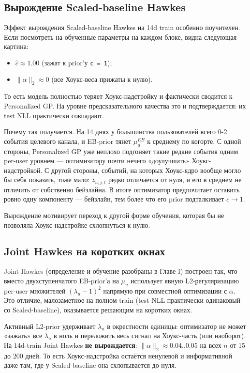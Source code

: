 \documentclass[12pt,a4paper]{article}
\begin{document}
\FloatBarrier
\subsection{Вырождение Scaled-baseline Hawkes}

Эффект вырождения Scaled-baseline Hawkes на 14d train особенно поучителен. Если посмотреть на обученные параметры на каждом блоке, видна следующая картина:

\begin{itemize}
  \item $\hat{c} \approx  1.00$ (зажат к prior'у \texttt{c = 1});
  \item $\|\alpha \|_2 \approx  0$ (все Хоукс-веса прижаты к нулю).
\end{itemize}


То есть модель полностью теряет Хоукс-надстройку и фактически сводится к Personalized GP. На уровне предсказательного качества это и подтверждается: их test NLL практически совпадают.

Почему так получается. На 14 днях у большинства пользователей всего 0-2 события целевого канала, и EB-prior тянет $\mu _u^{EB}$ к среднему по когорте. С одной стороны, Personalized GP уже неплохо подгоняет такие редкие события одним per-user уровнем --- оптимизатору почти нечего «доулучшать» Хоукс-надстройкой. С другой стороны, событий, на которых Хоукс-ядро вообще могло бы себя показать, тоже мало: $z_{u,j,t}$ редко отличается от нуля, и его в среднем не отличить от собственно бейзлайна. В итоге оптимизатор предпочитает оставить ровно одну компоненту --- бейзлайн, тем более что его prior подталкивает $c \to 1$.

Вырождение мотивирует переход к другой форме обучения, которая бы не позволяла Хоукс-надстройке схлопнуться к нулю.

\FloatBarrier
\subsection{Joint Hawkes на коротких окнах}

Joint Hawkes (определение и обучение разобраны в Главе I) построен так, что вместо двухступенчатого EB-prior'а на $\mu _u$ использует явную L2-регуляризацию per-user множителей $(\lambda _u - 1)^2$ напрямую при совместной оптимизации с $\alpha $. Это отличие, малозаметное на полном train (test NLL практически одинаковый со Scaled-baseline), оказывается решающим на коротких окнах.

Активный L2-prior удерживает $\lambda _u$ в окрестности единицы: оптимизатор не может «зажать» все $\lambda _u$ в ноль и переложить весь сигнал на Хоукс-часть (или наоборот). На $14\text{d}$-train Joint Hawkes \textbf{не вырождается}: $\|\alpha \|_2 \approx  0.04..0.05$ на всех $n$ от 15 до 200 дней. То есть Хоукс-надстройка остаётся ненулевой и информативной даже там, где у Scaled-baseline она схлопывается до нуля.
\end{document}
